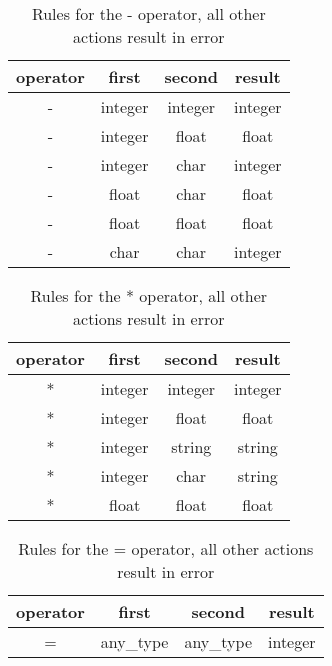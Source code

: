 \begin{table}[h!]
\begin{center}
\begin{tabular}{ |c|c|c|c| }
 \hline
 operator & first & second & result   \\ \hline
 - & integer & integer & integer   \\ \hline
 - & integer & float & float\\ 	\hline
 - & integer & char & integer \\ \hline
 - & float & char & float \\ \hline
 - & float & float & float \\ \hline
 - & char & char & integer \\ \hline
\end{tabular}
\caption{Rules for the - operator, all other actions result in error}
\end{center}
\end{table}

\begin{table}[h!]
\begin{center}
\begin{tabular}{ |c|c|c|c| }
 \hline
 operator & first & second & result   \\ \hline
 * & integer & integer & integer   \\ \hline
 * & integer & float & float\\ 	\hline
 * & integer & string & string \\ \hline
 * & integer & char & string \\ \hline
 * & float & float & float \\ \hline
\end{tabular}
\caption{Rules for the * operator, all other actions result in error}
\end{center}
\end{table}

\begin{table}[h!]
\begin{center}
\begin{tabular}{ |c|c|c|c| }
 \hline
 operator & first & second & result   \\ \hline
 = & any\_type & any\_type & integer \\ \hline
\end{tabular}
\caption{Rules for the = operator, all other actions result in error}
\end{center}
\end{table}

